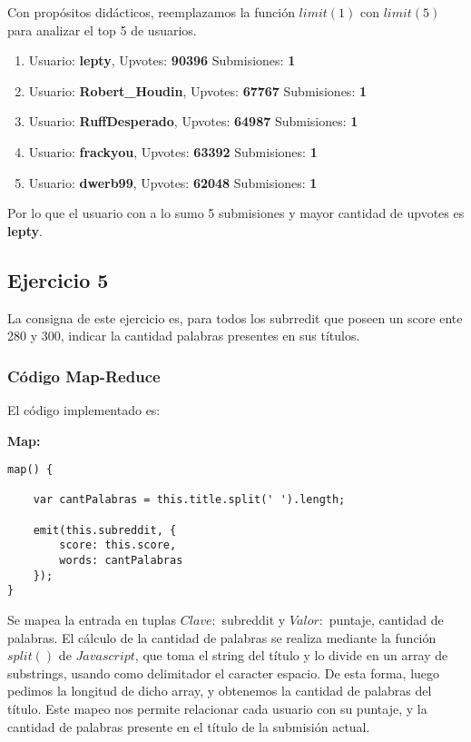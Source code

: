 Con prop\'ositos did\'acticos, reemplazamos la funci\'on $limit(1)$ con $limit(5)$ para analizar el top 5 de usuarios.

\begin{enumerate}

\item Usuario: \textbf{lepty}, Upvotes: \textbf{90396} Submisiones: \textbf{1}
\item Usuario: \textbf{Robert\_Houdin}, Upvotes: \textbf{67767} Submisiones: \textbf{1}
\item Usuario: \textbf{RuffDesperado}, Upvotes: \textbf{64987} Submisiones: \textbf{1}
\item Usuario: \textbf{frackyou}, Upvotes: \textbf{63392} Submisiones: \textbf{1}
\item Usuario: \textbf{dwerb99}, Upvotes: \textbf{62048} Submisiones: \textbf{1}

\end{enumerate}

Por lo que el usuario con a lo sumo 5 submisiones y mayor cantidad de upvotes es \textbf{lepty}.

\subsection{Ejercicio 5}

La consigna de este ejercicio es, para todos los subrredit que poseen un score ente 280 y 300, indicar la cantidad palabras presentes en sus t\'itulos.

\subsubsection{C\'odigo Map-Reduce}

El c\'odigo implementado es:

\textbf{Map:}

\begin{lstlisting}
map() {

	var cantPalabras = this.title.split(' ').length;

    emit(this.subreddit, {
    	score: this.score,
    	words: cantPalabras
    });
}

\end{lstlisting}

Se mapea la entrada en tuplas $Clave:$ subreddit y $Valor:$ puntaje, cantidad de palabras. El c\'alculo de la cantidad de palabras se realiza mediante la funci\'on $split()$ de $Javascript$, que toma el string del t\'itulo y lo divide en un array de substrings, usando como delimitador el caracter espacio. De esta forma, luego pedimos la longitud de dicho array, y obtenemos la cantidad de palabras del t\'itulo. Este mapeo nos permite relacionar cada usuario con su puntaje, y la cantidad de palabras presente en el t\'itulo de la submisi\'on actual.

